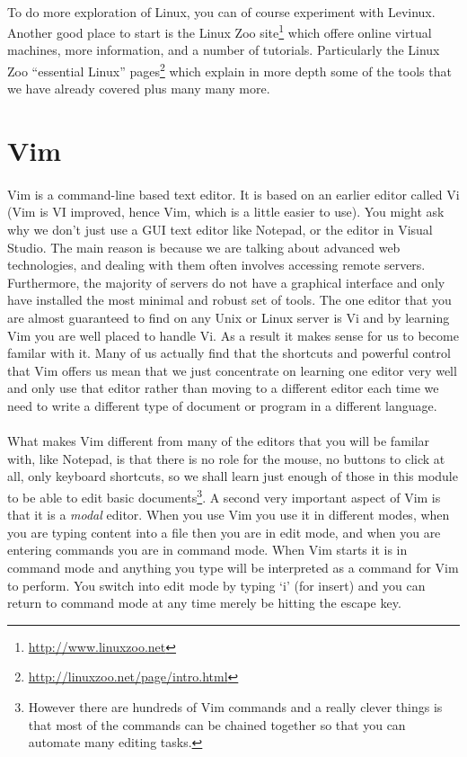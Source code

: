 \documentclass[12pt, a4paper, twoside]{book}
\begin{document}
\paragraph{} To do more exploration of Linux, you can of course experiment with Levinux. Another good place to start is the Linux Zoo site\footnote{\url{http://www.linuxzoo.net}} which offere online virtual machines, more information, and a number of tutorials. Particularly the Linux Zoo ``essential Linux'' pages\footnote{\url{http://linuxzoo.net/page/intro.html}} which explain in more depth some of the tools that we have already covered plus many many more.








\section{Vim}
\label{vim}
\paragraph{} Vim is a command-line based text editor. It is based on an earlier editor called Vi (Vim is VI improved, hence Vim, which is a little easier to use). You might ask why we don't just use a GUI text editor like Notepad, or the editor in Visual Studio. The main reason is because we are talking about advanced web technologies, and dealing with them often involves accessing remote servers. Furthermore, the majority of servers do not have a graphical interface and only have installed the most minimal and robust set of tools. The one editor that you are almost guaranteed to find on any Unix or Linux server is Vi and by learning Vim you are well placed to handle Vi. As a result it makes sense for us to become familar with it. Many of us actually find that the shortcuts and powerful control that Vim offers us mean that we just concentrate on learning one editor very well and only use that editor rather than moving to a different editor each time we need to write a different type of document or program in a different language.

\paragraph{} What makes Vim different from many of the editors that you will be familar with, like Notepad, is that there is no role for the mouse, no buttons to click at all, only keyboard shortcuts, so we shall learn just enough of those in this module to be able to edit basic documents\footnote{However there are hundreds of Vim commands and a really clever things is that most of the commands can be chained together so that you can automate many editing tasks.}. A second very important aspect of Vim is that it is a \emph{modal} editor. When you use Vim you use it in different modes, when you are typing content into a file then you are in edit mode, and when you are entering commands you are in command mode. When Vim starts it is in command mode and anything you type will be interpreted as a command for Vim to perform. You switch into edit mode by typing `i' (for insert) and you can return to command mode at any time merely be hitting the escape key.
\end{document}
